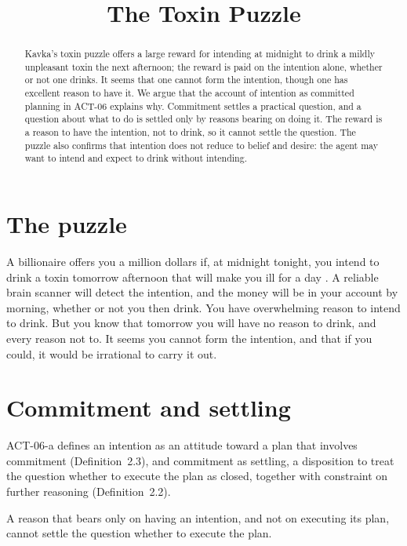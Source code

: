 \documentclass{situationist-preprint}
\title{The Toxin Puzzle}
\begin{document}
\maketitle

\begin{abstract}
Kavka's toxin puzzle offers a large reward for intending at midnight to drink a mildly unpleasant toxin the next afternoon; the reward is paid on the intention alone, whether or not one drinks. It seems that one cannot form the intention, though one has excellent reason to have it. We argue that the account of intention as committed planning in ACT-06 explains why. Commitment settles a practical question, and a question about what to do is settled only by reasons bearing on doing it. The reward is a reason to have the intention, not to drink, so it cannot settle the question. The puzzle also confirms that intention does not reduce to belief and desire: the agent may want to intend and expect to drink without intending.
\end{abstract}

\section{The puzzle}

A billionaire offers you a million dollars if, at midnight tonight, you intend to drink a toxin tomorrow afternoon that will make you ill for a day \citep{Kavka1983}. A reliable brain scanner will detect the intention, and the money will be in your account by morning, whether or not you then drink. You have overwhelming reason to intend to drink. But you know that tomorrow you will have no reason to drink, and every reason not to. It seems you cannot form the intention, and that if you could, it would be irrational to carry it out.

\section{Commitment and settling}

ACT-06-a defines an intention as an attitude toward a plan that involves commitment (Definition~2.3), and commitment as settling, a disposition to treat the question whether to execute the plan as closed, together with constraint on further reasoning (Definition~2.2).

\begin{proposition}\label{p:settle}
A reason that bears only on having an intention, and not on executing its plan, cannot settle the question whether to execute the plan.
\end{proposition}
\end{document}
